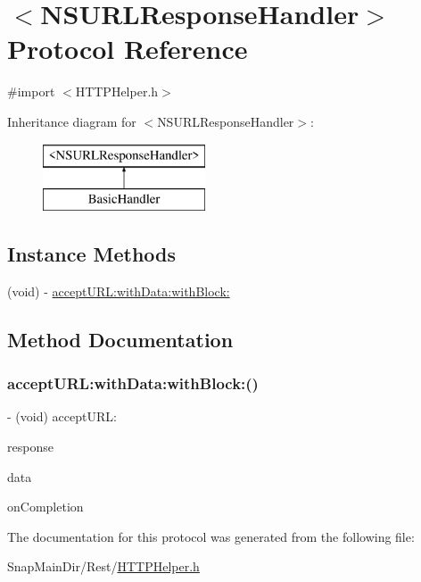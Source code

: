 \hypertarget{protocol_n_s_u_r_l_response_handler-p}{}\section{$<$N\+S\+U\+R\+L\+Response\+Handler$>$ Protocol Reference}
\label{protocol_n_s_u_r_l_response_handler-p}


{\ttfamily \#import $<$H\+T\+T\+P\+Helper.\+h$>$}

Inheritance diagram for $<$N\+S\+U\+R\+L\+Response\+Handler$>$\+:\begin{figure}[H]
\begin{center}
\leavevmode
\includegraphics[height=2.000000cm]{protocol_n_s_u_r_l_response_handler-p}
\end{center}
\end{figure}
\subsection*{Instance Methods}
\begin{DoxyCompactItemize}
\item 
(void) -\/ \hyperlink{protocol_n_s_u_r_l_response_handler-p_add1b339671a0d0396e0fa3ca498c829d}{accept\+U\+R\+L\+:with\+Data\+:with\+Block\+:}
\end{DoxyCompactItemize}


\subsection{Method Documentation}
\hypertarget{protocol_n_s_u_r_l_response_handler-p_add1b339671a0d0396e0fa3ca498c829d}{}\label{protocol_n_s_u_r_l_response_handler-p_add1b339671a0d0396e0fa3ca498c829d} 
\subsubsection{\texorpdfstring{accept\+U\+R\+L\+:with\+Data\+:with\+Block\+:()}{acceptURL:withData:withBlock:()}}
{\footnotesize\ttfamily -\/ (void) accept\+U\+R\+L\+: \begin{DoxyParamCaption}\item[{(N\+S\+U\+R\+L\+Response $\ast$)}]{response }\item[{withData:(N\+S\+Data $\ast$)}]{data }\item[{withBlock:(void($^\wedge$)(B\+O\+OL, id))}]{on\+Completion }\end{DoxyParamCaption}}



The documentation for this protocol was generated from the following file\+:\begin{DoxyCompactItemize}
\item 
Snap\+Main\+Dir/\+Rest/\hyperlink{_h_t_t_p_helper_8h}{H\+T\+T\+P\+Helper.\+h}\end{DoxyCompactItemize}
